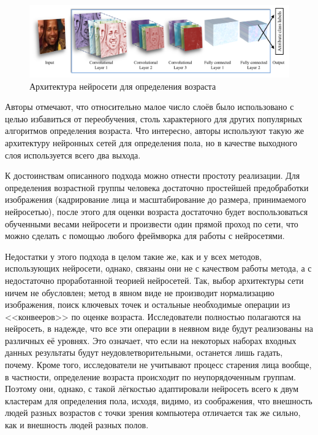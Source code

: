 \begin{figure}[t]
	\centering
	\includegraphics[width=\textwidth]{cnn.png}
	\caption{Архитектура нейросети для определения возраста}
	\label{fig:cnn}
\end{figure}

Авторы отмечают, что относительно малое число слоёв было использовано с целью избавиться от переобучения, столь характерного для других популярных алгоритмов определения возраста. Что интересно, авторы используют такую же архитектуру нейронных сетей для определения пола, но в качестве выходного слоя используется всего два выхода.

К достоинствам описанного подхода можно отнести простоту реализации. Для определения возрастной группы человека достаточно простейшей предобработки изображения (кадрирование лица и масштабирование до размера, принимаемого нейросетью), после этого для оценки возраста достаточно будет воспользоваться обученными весами нейросети и произвести один прямой проход по сети, что можно сделать с помощью любого фреймворка для работы с нейросетями.

Недостатки у этого подхода в целом такие же, как и у всех методов, использующих нейросети, однако, связаны они не с качеством работы метода, а с недостаточно проработанной теорией нейросетей. Так, выбор архитектуры сети ничем не обусловлен; метод в явном виде не производит нормализацию изображения, поиск ключевых точек и остальные необходимые операции из <<конвееров>> по оценке возраста. Исследователи полностью полагаются на нейросеть, в надежде, что все эти операции в неявном виде будут реализованы на различных её уровнях. Это означает, что если на некоторых наборах входных данных результаты будут неудовлетворительными, останется лишь гадать, почему. Кроме того, исследователи не учитывают процесс старения лица вообще, в частности, определение возраста происходит по неупорядоченным группам. Поэтому они, однако, с такой лёгкостью адаптировали нейросеть всего к двум кластерам для определения пола, исходя, видимо, из соображения, что внешность людей разных возрастов с точки зрения компьютера отличается так же сильно, как и внешность людей разных полов.

